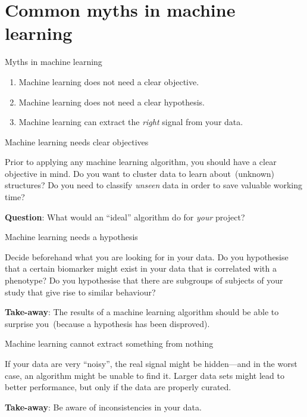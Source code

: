 \documentclass[aspectratio=169]{beamer}
\begin{document}
  \section{Common myths in machine learning}

  \begin{frame}{Myths in machine learning}
    \begin{enumerate}
      \item Machine learning does not need a clear objective.
      \item Machine learning does not need a clear hypothesis.
      \item Machine learning can extract the \emph{right} signal from your data.
    \end{enumerate}
  \end{frame}

  \begin{frame}{Machine learning needs clear objectives}
    \begin{block}{}
      Prior to applying any machine learning algorithm, you should have
      a clear objective in mind. Do you want to cluster data to learn
      about~(unknown) structures? Do you need to classify \emph{unseen}
      data in order to save valuable working time?
    \end{block}
    \vfill
    \textbf{Question}: What would an ``ideal'' algorithm do for \emph{your} project?
  \end{frame}

  \begin{frame}{Machine learning needs a hypothesis}
    \begin{block}{}
      Decide beforehand what you are looking for in your data. Do you
      hypothesise that a certain biomarker might exist in your data that
      is correlated with a phenotype? Do you hypothesise that there are
      subgroups of subjects of your study that give rise to similar
      behaviour?
    \end{block}
    \vfill
    \textbf{Take-away}: The results of a machine learning algorithm
    should be able to surprise you~(because a hypothesis has been
    disproved).
  \end{frame}

  \begin{frame}{Machine learning cannot extract something from nothing}
    \begin{block}{}
      If your data are very ``noisy'', the real signal might be
      hidden---and in the worst case, an algorithm might be unable to
      find it. Larger data sets might lead to better performance, but
      only if the data are properly curated.
    \end{block}
    \vfill
    \textbf{Take-away}: Be aware of inconsistencies in your data.
  \end{frame}
\end{document}
